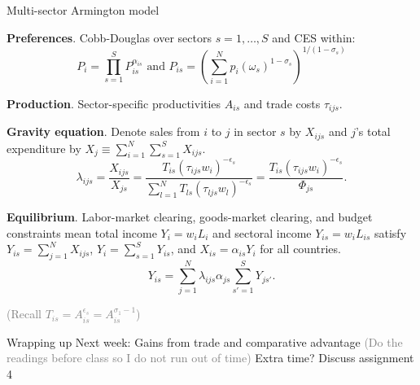\documentclass[10pt,notes=hide,aspectratio=169]{beamer}
\begin{document}
\begin{frame}{Multi-sector Armington model}
\begin{itemize}{\small
\item \textbf{Preferences}.
Cobb-Douglas over sectors $s = 1, \dots, S$ and CES within:
\begin{equation*}
P_i = \prod_{s=1}^S P_{is}^{\alpha_{is}} \text{ and } P_{is} = \left(\sum_{i=1}^{N} p_i(\omega_s)^{1-\sigma_s} \right)^{1/(1-\sigma_s)}
\end{equation*}
\item \textbf{Production}.
Sector-specific productivities $A_{is}$ and trade costs $\tau_{ijs}$.
\item \textbf{Gravity equation}.
Denote sales from $i$ to $j$ in sector $s$ by $X_{ijs}$ 
and $j$'s total expenditure by $X_j \equiv \sum_{i=1}^{N} \sum_{s=1}^{S} X_{ijs}$.
\begin{equation*}
\lambda_{ijs} = \frac{X_{ijs}}{X_{js}}
= \frac{T_{is} \left(\tau_{ijs}w_i\right)^{-\epsilon_s}}{\sum_{l=1}^{N} T_{ls}  \left(\tau_{ljs}w_l\right)^{-\epsilon_s}}
=\frac{T_{is} \left(\tau_{ijs}w_i\right)^{-\epsilon_s}}{\Phi_{js}}.
\end{equation*}
\item \textbf{Equilibrium}.
Labor-market clearing, goods-market clearing, and budget constraints mean
total income $Y_i = w_i L_i$ and sectoral income $Y_{is} = w_i L_{is}$ satisfy
$Y_{is} = \sum_{j=1}^{N} X_{ijs}$, $Y_i = \sum_{s=1}^{S} Y_{is}$, and $X_{is} = \alpha_{is} Y_i$ for all countries.
\begin{equation*}
	Y_{is} = \sum_{j=1}^{N} \lambda_{ijs} \alpha_{js} \sum_{s'=1}^{S} Y_{js'} .
\end{equation*}
}\end{itemize}
\textcolor{gray}{(Recall $T_{is} = A_{is}^{\epsilon_s} = A_{is}^{\sigma_1 - 1}$)}
\end{frame}
\begin{frame}{Wrapping up}
Next week: Gains from trade and comparative advantage
\textcolor{gray}{(Do the readings before class so I do not run out of time)}
\vspace{2cm}
Extra time? Discuss assignment 4
\end{frame}
\end{document}
